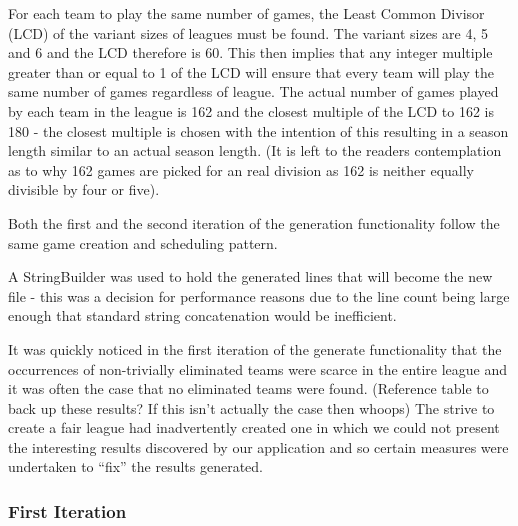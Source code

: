 For each team to play the same number of games, the Least Common
Divisor (LCD) of the variant sizes of leagues must be found. The
variant sizes are 4, 5 and 6 and the LCD therefore is 60. This then
implies that any integer multiple greater than or equal to 1 of the
LCD will ensure that every team will play the same number of games
regardless of league. The actual number of games played by each team
in the league is 162 and the closest multiple of the LCD to 162 is 180
- the closest multiple is chosen with the intention of this resulting
in a season length similar to an actual season length. (It is left to
the readers contemplation as to why 162 games are picked for an real
division as 162 is neither equally divisible by four or five).

Both the first and the second iteration of the generation
functionality follow the same game creation and scheduling pattern. 


A StringBuilder was used to hold the generated lines that will become
the new file - this was a decision for performance reasons due to the
line count being large enough that standard string concatenation would
be inefficient.

It was quickly noticed in the first iteration of the generate
functionality that the occurrences of non-trivially eliminated teams
were scarce in the entire league and it was often the case that no
eliminated teams were found. (Reference table to back up these
results? If this isn't actually the case then whoops) The strive to
create a fair league had inadvertently created one in which we could
not present the interesting results discovered by our application and
so certain measures were undertaken to ``fix'' the results generated.


\subsubsection{First Iteration}


